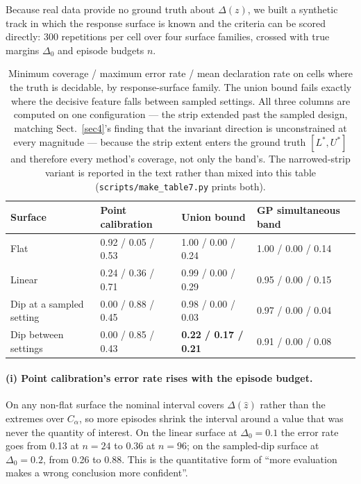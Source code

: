 \documentclass[pdflatex,iicol,sn-apa]{sn-jnl}
\theoremstyle{remark}
\begin{document}
Because real data provide no ground truth about $\Delta(z)$, we built a synthetic track in which the
response surface is known and the criteria can be scored directly: 300 repetitions per cell over
four surface families, crossed with true margins $\Delta_0$ and episode budgets $n$.

\begin{table}[t]
\caption{Minimum coverage / maximum error rate / mean declaration rate on cells where the truth is
decidable, by response-surface family. The union bound fails exactly where the decisive feature
falls between sampled settings. All three columns are computed on one configuration --- the strip
extended past the sampled design, matching Sect.~\ref{sec4}'s finding that the invariant direction
is unconstrained at every magnitude --- because the strip extent enters the ground truth $[L^*, U^*]$
and therefore every method's coverage, not only the band's. The narrowed-strip variant is reported in
the text rather than mixed into this table (\texttt{scripts/make\_table7.py} prints
both).}\label{tab7}
\begin{tabular}{@{}llll@{}}
\toprule
Surface & Point calibration & Union bound & GP simultaneous band \\
\midrule
Flat & 0.92 / 0.05 / 0.53 & 1.00 / 0.00 / 0.24 & 1.00 / 0.00 / 0.14 \\
Linear & 0.24 / 0.36 / 0.71 & 0.99 / 0.00 / 0.29 & 0.95 / 0.00 / 0.15 \\
Dip at a sampled setting & 0.00 / 0.88 / 0.45 & 0.98 / 0.00 / 0.03 & 0.97 / 0.00 / 0.04 \\
Dip between settings & 0.00 / 0.85 / 0.43 & \textbf{0.22 / 0.17 / 0.21} & 0.91 / 0.00 / 0.08 \\
\bottomrule
\end{tabular}
\end{table}

\paragraph{(i) Point calibration's error rate rises with the episode budget.}
On any non-flat surface the nominal interval covers $\Delta(\hat z)$ rather than the extremes over
$C_\alpha$, so more episodes shrink the interval around a value that was never the quantity of
interest. On the linear surface at $\Delta_0 = 0.1$ the error rate goes from 0.13 at $n = 24$ to
0.36 at $n = 96$; on the sampled-dip surface at $\Delta_0 = 0.2$, from 0.26 to 0.88. This is the
quantitative form of ``more evaluation makes a wrong conclusion more confident''.
\end{document}
